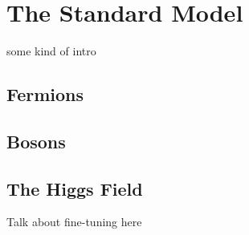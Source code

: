 \section{The Standard Model}
some kind of intro
\subsection{Fermions}
\subsection{Bosons}
\subsection{The Higgs Field}
Talk about fine-tuning here
